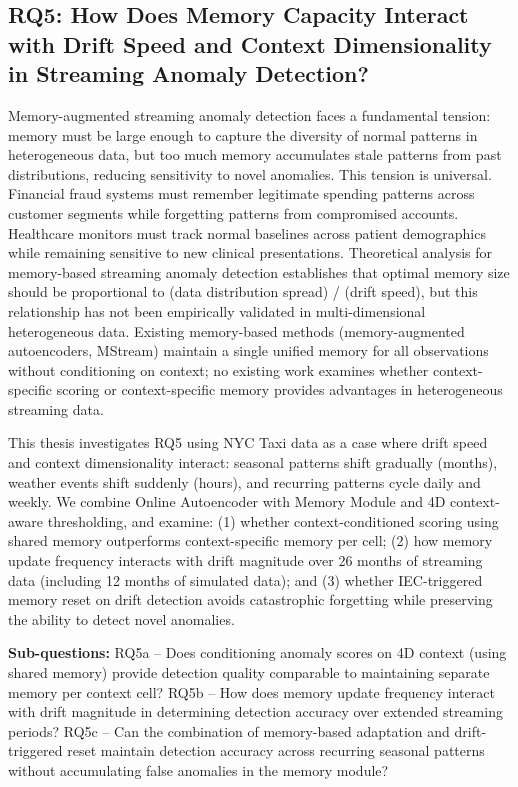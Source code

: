 \subsection{RQ5: How Does Memory Capacity Interact with Drift Speed and Context Dimensionality in Streaming Anomaly Detection?}

Memory-augmented streaming anomaly detection faces a fundamental tension: memory must be large enough to capture the diversity of normal patterns in heterogeneous data, but too much memory accumulates stale patterns from past distributions, reducing sensitivity to novel anomalies. This tension is universal. Financial fraud systems must remember legitimate spending patterns across customer segments while forgetting patterns from compromised accounts. Healthcare monitors must track normal baselines across patient demographics while remaining sensitive to new clinical presentations. Theoretical analysis for memory-based streaming anomaly detection establishes that optimal memory size should be proportional to (data distribution spread) / (drift speed), but this relationship has not been empirically validated in multi-dimensional heterogeneous data. Existing memory-based methods (memory-augmented autoencoders, MStream) maintain a single unified memory for all observations without conditioning on context; no existing work examines whether context-specific scoring or context-specific memory provides advantages in heterogeneous streaming data.

This thesis investigates RQ5 using NYC Taxi data as a case where drift speed and context dimensionality interact: seasonal patterns shift gradually (months), weather events shift suddenly (hours), and recurring patterns cycle daily and weekly. We combine Online Autoencoder with Memory Module and 4D context-aware thresholding, and examine: (1) whether context-conditioned scoring using shared memory outperforms context-specific memory per cell; (2) how memory update frequency interacts with drift magnitude over 26 months of streaming data (including 12 months of simulated data); and (3) whether IEC-triggered memory reset on drift detection avoids catastrophic forgetting while preserving the ability to detect novel anomalies.

\textbf{Sub-questions:} RQ5a -- Does conditioning anomaly scores on 4D context (using shared memory) provide detection quality comparable to maintaining separate memory per context cell? RQ5b -- How does memory update frequency interact with drift magnitude in determining detection accuracy over extended streaming periods? RQ5c -- Can the combination of memory-based adaptation and drift-triggered reset maintain detection accuracy across recurring seasonal patterns without accumulating false anomalies in the memory module?

